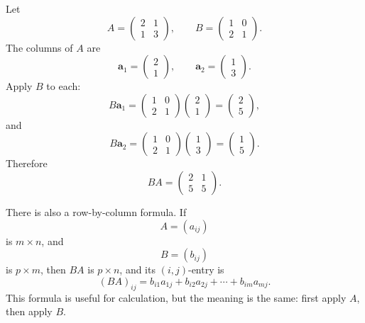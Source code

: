 \begin{example}
Let
\[
    A=
    \begin{pmatrix}
        2&1\\
        1&3
    \end{pmatrix},
    \qquad
    B=
    \begin{pmatrix}
        1&0\\
        2&1
    \end{pmatrix}.
\]
The columns of \(A\) are
\[
    \mathbf a_1=
    \begin{pmatrix}2\\1\end{pmatrix},
    \qquad
    \mathbf a_2=
    \begin{pmatrix}1\\3\end{pmatrix}.
\]
Apply \(B\) to each:
\[
    B\mathbf a_1
    =
    \begin{pmatrix}
        1&0\\
        2&1
    \end{pmatrix}
    \begin{pmatrix}2\\1\end{pmatrix}
    =
    \begin{pmatrix}2\\5\end{pmatrix},
\]
and
\[
    B\mathbf a_2
    =
    \begin{pmatrix}
        1&0\\
        2&1
    \end{pmatrix}
    \begin{pmatrix}1\\3\end{pmatrix}
    =
    \begin{pmatrix}1\\5\end{pmatrix}.
\]
Therefore
\[
    BA=
    \begin{pmatrix}
        2&1\\
        5&5
    \end{pmatrix}.
\]
\end{example}

There is also a row-by-column formula.  If
\[
    A=(a_{ij})
\]
is \(m\times n\), and
\[
    B=(b_{ij})
\]
is \(p\times m\), then \(BA\) is \(p\times n\), and its \((i,j)\)-entry is
\[
\boxed{
    (BA)_{ij}
    =
    b_{i1}a_{1j}+b_{i2}a_{2j}+\cdots+b_{im}a_{mj}.
}
\]
This formula is useful for calculation, but the meaning is the same: first apply \(A\),
then apply \(B\).

